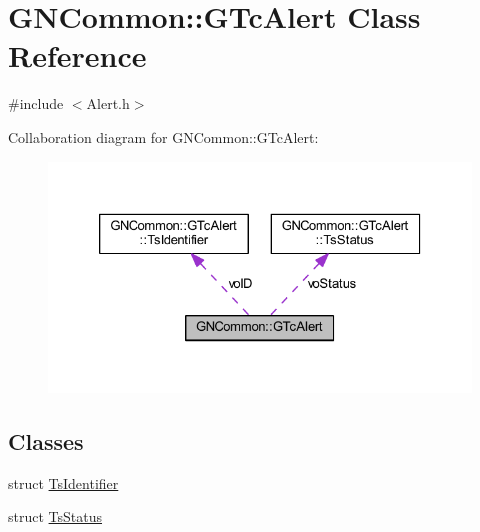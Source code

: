 \hypertarget{class_g_n_common_1_1_g_tc_alert}{}\section{G\+N\+Common\+:\+:G\+Tc\+Alert Class Reference}
\label{class_g_n_common_1_1_g_tc_alert}


{\ttfamily \#include $<$Alert.\+h$>$}



Collaboration diagram for G\+N\+Common\+:\+:G\+Tc\+Alert\+:\nopagebreak
\begin{figure}[H]
\begin{center}
\leavevmode
\includegraphics[width=326pt]{class_g_n_common_1_1_g_tc_alert__coll__graph}
\end{center}
\end{figure}
\subsection*{Classes}
\begin{DoxyCompactItemize}
\item 
struct \mbox{\hyperlink{struct_g_n_common_1_1_g_tc_alert_1_1_ts_identifier}{Ts\+Identifier}}
\item 
struct \mbox{\hyperlink{struct_g_n_common_1_1_g_tc_alert_1_1_ts_status}{Ts\+Status}}
\end{DoxyCompactItemize}
